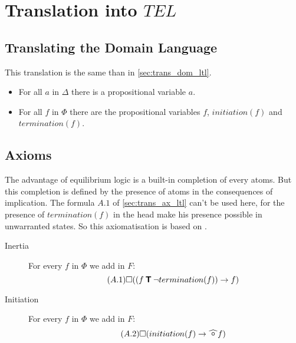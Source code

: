 \section{Translation into $TEL$}\label{sec:translation_e}

\subsection{Translating the Domain Language}

This translation is the same than in \ref{sec:trans_dom_ltl}.

\begin{itemize}
  \item For all $a$ in $\Delta$ there is a propositional variable $a$.
  \item For all $f$ in $\Phi$ there are the propositional variables $f$, $initiation(f)$ and $termination(f)$.
\end{itemize}

\subsection{Axioms}

The advantage of equilibrium logic is a built-in completion of every atoms.
But this completion is defined by the presence of atoms in the consequences of implication.
The formula $A.1$ of \ref{sec:trans_ax_ltl} can't be used here, for the presence of $termination(f)$ in the head make his presence possible in unwarranted states.
So this axiomatisation is based on \label{sec:sec}.

\begin{description}
  \item[Inertia]
    For every $f$ in $\Phi$ we add in $F$:
    \begin{equation}\tag{$A.1$}\label{sec:sec}
      \square((f \mathbin{\bm{\mathsf{T}}} \neg termination(f)) \rightarrow f)
    \end{equation}
  \item[Initiation]
    For every $f$ in $\Phi$ we add in $F$:
    \begin{equation}\tag{$A.2$}
      \alwaysF(initiation(f)\rightarrow\wnext f)
    \end{equation}
\end{description}

